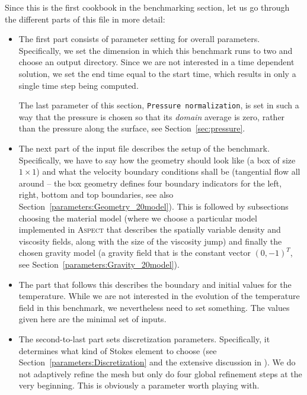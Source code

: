 \documentclass{article}
\newcommand{\aspect}{\textsc{Aspect}}
\begin{document}
Since this is the first cookbook in the benchmarking section, let us go
through the different parts of this file in more detail:
\begin{itemize}
\item The first part consists of parameter setting for overall
  parameters. Specifically, we set the dimension in which this benchmark runs
  to two and choose an output directory. Since we are not interested in a time
  dependent solution, we set the end time equal to the start time, which
  results in only a single time step being computed.

  The last parameter of this section, \texttt{Pressure normalization},
  is set in such a way that the pressure is chosen so that its \textit{domain}
  average is zero, rather than the pressure along the surface, see
  Section~\ref{sec:pressure}.

\item The next part of the input file describes the setup of the
  benchmark. Specifically, we have to say how the geometry should look like (a
  box of size $1\times 1$) and what the velocity boundary conditions shall be
  (tangential flow all around -- the box geometry defines four boundary
  indicators for the left, right, bottom and top boundaries, see also
  Section~\ref{parameters:Geometry_20model}). This is followed by subsections
  choosing the material model (where we choose a particular model implemented
  in \aspect{} that describes the spatially variable density and viscosity
  fields, along with the size of the viscosity jump) and finally the chosen
  gravity model (a gravity field that is the constant vector $(0,-1)^T$, see
  Section~\ref{parameters:Gravity_20model}).

\item The part that follows this describes the boundary and initial values for
  the temperature. While we are not interested in the evolution of the
  temperature field in this benchmark, we nevertheless need to set
  something. The values given here are the minimal set of inputs.

\item The second-to-last part sets discretization parameters. Specifically, it
  determines what kind of Stokes element to choose (see
  Section~\ref{parameters:Discretization} and the extensive discussion in
  \cite{KHB12}). We do not adaptively refine the mesh but only do four global
  refinement steps at the very beginning. This is obviously a parameter worth
  playing with.


\end{itemize}
\end{document}
